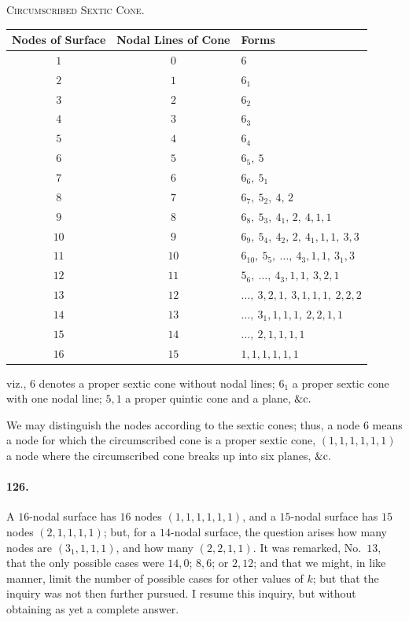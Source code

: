 \documentclass[11pt,a4paper]{article}
\begin{document}
\medskip

\begin{center}
\textsc{Circumscribed Sextic Cone.}
\end{center}

\medskip

\begin{center}
\begin{tabular}{c|c|l}
\textbf{Nodes of Surface} & \textbf{Nodal Lines of Cone} & \textbf{Forms} \\
\hline
$1$  & $0$  & $6$ \\
$2$  & $1$  & $6_1$ \\
$3$  & $2$  & $6_2$ \\
$4$  & $3$  & $6_3$ \\
$5$  & $4$  & $6_4$ \\
$6$  & $5$  & $6_5,\ 5$ \\
$7$  & $6$  & $6_6,\ 5_1$ \\
$8$  & $7$  & $6_7,\ 5_2,\ 4,\,2$ \\
$9$  & $8$  & $6_8,\ 5_3,\ 4_1,\,2,\ 4,1,1$ \\
$10$ & $9$  & $6_9,\ 5_4,\ 4_2,\,2,\ 4_1,1,1,\ 3,3$ \\
$11$ & $10$ & $6_{10},\ 5_5,\ \dotsc,\ 4_3,1,1,\ 3_1,3$ \\
$12$ & $11$ & $5_6,\ \dotsc,\ 4_3,1,1,\ 3,2,1$ \\
$13$ & $12$ & $\dotsc,\ 3,2,1,\ 3,1,1,1,\ 2,2,2$ \\
$14$ & $13$ & $\dotsc,\ 3_1,1,1,1,\ 2,2,1,1$ \\
$15$ & $14$ & $\dotsc,\ 2,1,1,1,1$ \\
$16$ & $15$ & $1,1,1,1,1,1$
\end{tabular}
\end{center}

\medskip

\noindent viz., $6$ denotes a proper sextic cone without nodal lines;
$6_1$ a proper sextic cone with one nodal line; $5,1$ a proper quintic
cone and a plane, $\&{\rm c}.$

\medskip

We may distinguish the nodes according to the sextic cones; thus, a node
$6$ means a node for which the circumscribed cone is a proper sextic cone,
$(1, 1, 1, 1, 1, 1)$ a node where the circumscribed cone breaks up into
six planes, $\&{\rm c}.$

\paragraph{126.}
A $16$-nodal surface has $16$ nodes $(1, 1, 1, 1, 1, 1)$, and a $15$-nodal
surface has $15$ nodes $(2, 1, 1, 1, 1)$; but, for a $14$-nodal surface,
the question arises how many nodes are $(3_1, 1, 1, 1)$, and how many
$(2, 2, 1, 1)$. It was remarked, No.~$13$, that the only possible cases
were $14, 0$; $8, 6$; or $2, 12$; and that we might, in like manner,
limit the number of possible cases for other values of $k$; but that the
inquiry was not then further pursued. I resume this inquiry, but without
obtaining as yet a complete answer.
\end{document}
